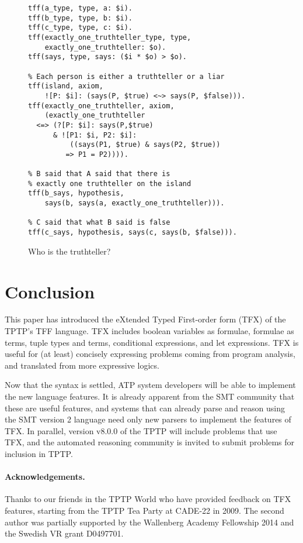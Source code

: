 \begin{figure}[ht]
\begin{lstlisting}[language=tptp]
tff(a_type, type, a: $i).
tff(b_type, type, b: $i).
tff(c_type, type, c: $i).
tff(exactly_one_truthteller_type, type,
    exactly_one_truthteller: $o).
tff(says, type, says: ($i * $o) > $o).

% Each person is either a truthteller or a liar
tff(island, axiom,
    ![P: $i]: (says(P, $true) <~> says(P, $false))).
tff(exactly_one_truthteller, axiom,
    (exactly_one_truthteller
  <=> (?[P: $i]: says(P,$true)
      & ![P1: $i, P2: $i]:
          ((says(P1, $true) & says(P2, $true))
         => P1 = P2)))).

% B said that A said that there is
% exactly one truthteller on the island
tff(b_says, hypothesis,
    says(b, says(a, exactly_one_truthteller))).

% C said that what B said is false
tff(c_says, hypothesis, says(c, says(b, $false))).
\end{lstlisting}
\caption{Who is the truthteller?}
\label{fig:tfx/Truthteller}
\end{figure}

\section{Conclusion}
\label{sec:tfx/Conclusion}

This paper has introduced the eXtended Typed First-order form (TFX) of the
TPTP's TFF language.
TFX includes boolean variables as formulae, formulae as terms, tuple types and
terms, conditional expressions, and let expressions.
TFX is useful for (at least) concisely expressing problems coming from 
program analysis, and translated from more expressive logics.

Now that the syntax is settled, ATP system developers will be able to
implement the new language features.
It is already apparent from the SMT community that these are useful features,
and systems that can already parse and reason using the SMT version 2 language 
need only new parsers to implement the features of TFX.
In parallel, version v8.0.0 of the TPTP will include problems that use TFX,
and the automated reasoning community is invited to submit problems for
inclusion in TPTP.

\paragraph{Acknowledgements.}
Thanks to our friends in the TPTP World who have provided feedback on TFX
features, starting from the TPTP Tea Party at CADE-22 in 2009. The second
author was partially supported by the Wallenberg Academy Fellowship 2014 and
the Swedish VR grant D0497701.